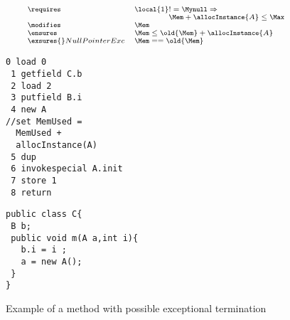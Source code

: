 \begin{figure}[!hbp]
$${\scriptsize
\begin{array}{ll}
 \requires &  \local{1} != \Mynull \Rightarrow  \\
           & \phantom{\local{1}} \Mem +  \allocInstance{A} \le \Max \\
  \modifies & \Mem \\
  \ensures  & \Mem \le \old{\Mem} +  \allocInstance{A} \\
  \exsures{} NullPointerExc  & \Mem == \old{\Mem}   \\
\end{array}}$$


\begin{minipage}[t]{90pt}
{\scriptsize
\begin{lstlisting}[frame=trbl]
 0 load 0
 1 getfield C.b
 2 load 2
 3 putfield B.i
 4 new A 
//set MemUsed = 
  MemUsed +
  allocInstance(A)
 5 dup
 6 invokespecial A.init
 7 store 1
 8 return
\end{lstlisting}
}
\end{minipage}


\begin{minipage}[t]{90pt}
{\scriptsize
\begin{lstlisting}[frame=trbl]
public class C{
 B b;
 public void m(A a,int i){
   b.i = i ;
   a = new A();
 }
}
\end{lstlisting}
}
\end{minipage}

\caption{\sc Example of a method with possible exceptional termination}
\label{excMeth}
\end{figure}
